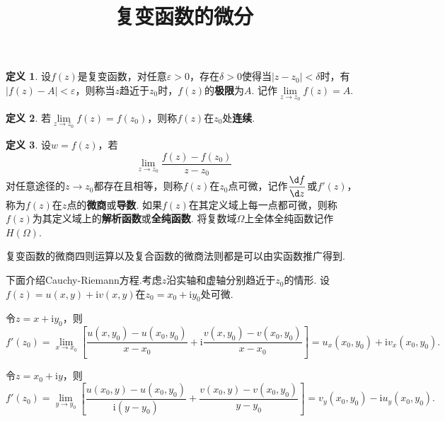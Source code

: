\documentclass[12pt]{ctexart}
\title{\vspace{-2em}\textbf{复变函数的微分}\vspace{-2em}}
\date{ }
\theoremstyle{definition}
\newtheorem{definition}{定义}
\theoremstyle{plain}
\newcommand{\iu}{\mathrm{i}}
\begin{document}
	\maketitle
	\begin{definition}
		设$f(z)$是复变函数，对任意$\varepsilon>0$，存在$\delta>0$使得当$|z-z_0|<\delta$时，有$\left|f(z)-A\right|<\varepsilon$，则称当$z$趋近于$z_0$时，$f(z)$的\textbf{极限}为$A$. 记作$\lim\limits_{z\to z_0}f(z)=A$.
	\end{definition}
	\begin{definition}
		若$\lim\limits_{z\to z_0}f(z)=f(z_0)$，则称$f(z)$在$z_0$处\textbf{连续}.
	\end{definition}
	\begin{definition}
		设$w=f(z)$，若
		$$\lim\limits_{z\to z_0}\frac{f(z)-f(z_0)}{z-z_0}$$
		对任意途径的$z\to z_0$都存在且相等，则称$f(z)$在$z_0$点可微，记作$\dfrac{\d f}{\d z}$或$f'(z)$，称为$f(z)$在$z$点的\textbf{微商}或\textbf{导数}. 如果$f(z)$在其定义域上每一点都可微，则称$f(z)$为其定义域上的\textbf{解析函数}或\textbf{全纯函数}. 将复数域$\varOmega$上全体全纯函数记作$H(\varOmega)$.
	\end{definition}
	复变函数的微商四则运算以及复合函数的微商法则都是可以由实函数推广得到. 
	
	{\centering\hrulefill}
	
	\vspace{4mm}
	
	下面介绍Cauchy-Riemann方程.考虑$z$沿实轴和虚轴分别趋近于$z_0$的情形. 设$f(z)=u(x,y)+\iu v(x,y)$在$z_0=x_0+\iu y_0$处可微.
	
	令$z=x+\iu y_0$，则
	$$f'(z_0)=\lim\limits_{x\to x_0}\left[\frac{u(x,y_0)-u(x_0,y_0)}{x-x_0}+\iu\frac{v(x,y_0)-v(x_0,y_0)}{x-x_0}\right]=u_x(x_0,y_0)+\iu v_x(x_0,y_0).$$
	
	令$z=x_0+\iu y$，则
	$$f'(z_0)=\lim\limits_{y\to y_0}\left[\frac{u(x_0,y)-u(x_0,y_0)}{\iu(y-y_0)}+\frac{v(x_0,y)-v(x_0,y_0)}{y-y_0}\right]=v_y(x_0,y_0)-\iu u_y(x_0,y_0).$$
	
\end{document}
